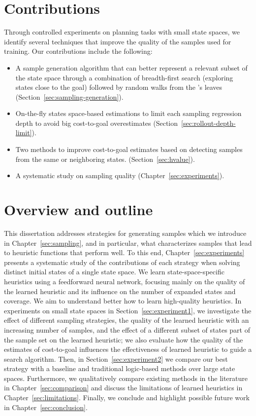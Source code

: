 \section{Contributions}
\label{sec:intro_contributions}

Through controlled experiments on planning tasks with small state spaces, we identify several techniques that improve the quality of the samples used for training. Our contributions include the following:

\begin{itemize}
    \item A sample generation algorithm that can better represent a relevant subset of the state space through a combination of breadth-first search (exploring states close to the goal) followed by random walks from the \bfs's leaves (Section~\ref{sec:sampling-generation}).
    \item On-the-fly states space-based estimations to limit each sampling regression depth to avoid big cost-to-goal overestimates (Section~\ref{sec:rollout-depth-limit}).
    \item Two methods to improve cost-to-goal estimates based on detecting samples from the same or neighboring states. (Section~\ref{sec:hvalue}).
    \item A systematic study on sampling quality (Chapter~\ref{sec:experiments}).
\end{itemize}

\section{Overview and outline}
\label{sec:intro_outline}

This dissertation addresses strategies for generating samples which we introduce in Chapter~\ref{sec:sampling}, and in particular, what characterizes samples that lead to heuristic functions that perform well. To this end, Chapter~\ref{sec:experiments} presents a systematic study of the contributions of each strategy when solving distinct initial states of a single state space. We learn state-space-specific heuristics using a feedforward neural network, focusing mainly on the quality of the learned heuristic and its influence on the number of expanded states and coverage. We aim to understand better how to learn high-quality heuristics. In experiments on small state spaces in Section~\ref{sec:experiment1}, we investigate the effect of different sampling strategies, the quality of the learned heuristic with an increasing number of samples, and the effect of a different subset of states part of the sample set on the learned heuristic; we also evaluate how the quality of the estimates of cost-to-goal influences the effectiveness of learned heuristic to guide a search algorithm. Then, in Section~\ref{sec:experiment2} we compare our best strategy with a baseline and traditional logic-based methods over large state spaces. Furthermore, we qualitatively compare existing methods in the literature in Chapter~\ref{sec:comparison} and discuss the limitations of learned heuristics in Chapter~\ref{sec:limitations}. Finally, we conclude and highlight possible future work in Chapter~\ref{sec:conclusion}.
